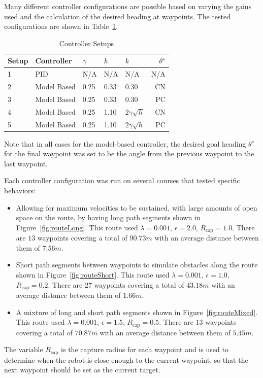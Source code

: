Many different controller configurations are possible based on varying the gains used and the calculation of the desired heading at waypoints.
The tested configurations are shown in Table~\ref{tab:resultsControllersSetup}.

\begin{table}[ht!]
\caption{Controller Setups}
\small
\centering
\begin{tabular}{@{}lllllr@{}} \toprule
Setup & Controller  & $\gamma$ & $h$  & $k$               & $\theta^\star$ \\ \midrule
1     & PID         & N/A      & N/A  & N/A               & N/A \\
2     & Model Based & 0.25     & 0.33 & 0.30              & CN \\
3     & Model Based & 0.25     & 0.33 & 0.30              & PC \\
4     & Model Based & 0.25     & 1.10 & $2\gamma\sqrt{h}$ & CN \\
5     & Model Based & 0.25     & 1.10 & $2\gamma\sqrt{h}$ & PC \\ \bottomrule
\end{tabular}%
\label{tab:resultsControllersSetup}
\end{table}

Note that in all cases for the model-based controller, the desired goal heading $\theta^\star$ for the final waypoint was set to be the angle from the previous waypoint to the last waypoint.

Each controller configuration was run on several courses that tested specific behaviors:
\begin{itemize}
\item Allowing for maximum velocities to be sustained, with large amounts of open space on the route, by having long path segments shown in Figure~\ref{fig:routeLong}.
      This route used $\lambda = 0.001$, $\epsilon = 2.0$, $R_{\text{cap}} = 1.0$.
      There are $13$ waypoints covering a total of $90.73 m$ with an average distance between them of $7.56 m$.
\item Short path segments between waypoints to simulate obstacles along the route shown in Figure~\ref{fig:routeShort}.
      This route used $\lambda = 0.001$, $\epsilon = 1.0$, $R_{\text{cap}} = 0.2$.
      There are $27$ waypoints covering a total of $43.18 m$ with an average distance between them of $1.66 m$.
\item A mixture of long and short path segments shown in Figure~\ref{fig:routeMixed}.
      This route used $\lambda = 0.001$, $\epsilon = 1.5$, $R_{\text{cap}} = 0.5$.
      There are $13$ waypoints covering a total of $70.87 m$ with an average distance between them of $5.45 m$.
\end{itemize}
The variable $R_{\text{cap}}$ is the capture radius for each waypoint and is used to determine when the robot is close enough to the current waypoint, so that the next waypoint should be set as the current target.

